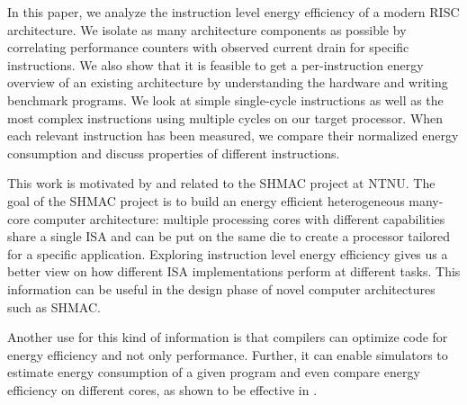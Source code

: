 In this paper, we analyze the instruction level energy efficiency of a modern
RISC architecture. We isolate as many architecture components as possible
by correlating performance counters with observed current drain for specific
instructions. We also show that it is feasible to get a per-instruction energy
overview of an existing architecture by understanding the hardware and writing
benchmark programs. We look at simple single-cycle instructions as well as the
most complex instructions using multiple cycles on our target processor. When
each relevant instruction has been measured, we compare their normalized energy
consumption and discuss properties of different instructions.

This work is motivated by and related to the SHMAC
project\cite{ntnushmac,Umuroglu662354,rusten2012implementing} at NTNU. The goal
of the SHMAC project is to build an energy efficient heterogeneous many-core
computer architecture: multiple processing cores with different capabilities
share a single ISA and can be put on the same die to create a processor tailored
for a specific application. Exploring instruction level energy efficiency gives
us a better view on how different ISA implementations perform at different
tasks\cite{kumar2003single}. This information can be useful in the design phase
of novel computer architectures such as SHMAC.

Another use for this kind of information is that compilers can optimize code for
energy efficiency and not only performance. Further, it can enable simulators to
estimate energy consumption of a given program and even compare energy
efficiency on different cores, as shown to be effective in \cite{kumar2003single}.

\vfill

